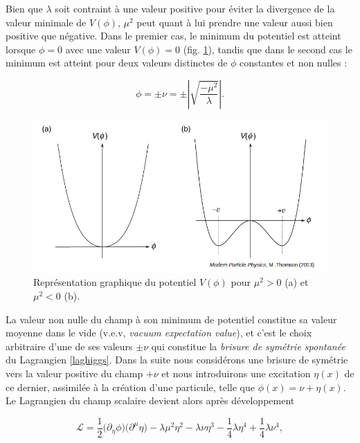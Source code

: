         Bien que $\lambda$ soit contraint à une valeur positive pour éviter la divergence de la valeur minimale de $V(\phi)$, $\mu^2$ peut quant à lui prendre une valeur aussi bien positive que négative. Dans le premier cas, le minimum du potentiel est atteint lorsque $\phi=0$ avec une valeur $V(\phi)=0$ (fig. \ref{HiggsV1D}), tandis que dans le second cas le minimum est atteint pour deux valeurs distinctes de $\phi$ constantes et non nulles :

        \begin{equation}
            \phi=\pm\nu=\pm\displaystyle\left\lvert \sqrt{\frac{-\mu^2}{\lambda}} \right\rvert.
        \end{equation}

        \begin{figure}
        \centering
            \includegraphics[scale=0.4]{Chapitre2/Images/higgsV1D.png} 
            \caption{Représentation graphique du potentiel $V(\phi)$ pour $\mu^2>0$ (a) et $\mu^2<0$ (b).}
        \label{HiggsV1D}
        \end{figure}

        La valeur non nulle du champ à son minimum de potentiel constitue sa valeur moyenne dans le vide (v.e.v, \textit{vacuum expectation value}), et c'est le choix arbitraire d'une de ses valeurs $\pm\nu$ qui constitue la \textit{brisure de symétrie spontanée} du Lagrangien \ref{laghiggs}. Dans la suite nous considérons une brisure de symétrie vers la valeur positive du champ $+\nu$ et nous introduirons une excitation $\eta(x)$ de ce dernier, assimilée à la création d'une particule, telle que $\phi(x)=\nu+\eta(x)$. Le Lagrangien du champ scalaire devient alors après développement

        \begin{equation*}
        \boxed{
            \mathcal{L}=\frac{1}{2}\bigl(\partial_{\eta}\phi\bigr)\bigl(\partial^{\mu}\eta\bigr)-\lambda\mu^2\eta^2-\lambda\nu\eta^3-\frac{1}{4}\lambda\eta^4+\frac{1}{4}\lambda\nu^4,
        }
        \end{equation*}

